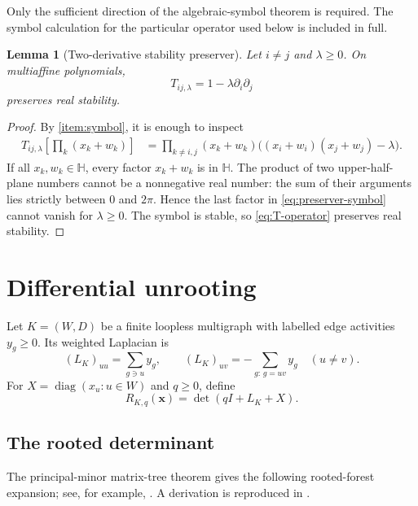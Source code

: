 \documentclass[11pt]{article}
\numberwithin{equation}{section}
\newtheorem{lemma}[theorem]{Lemma}
\newcommand{\Hh}{\mathbb H}
\newcommand{\xx}{\bm x}
\newcommand{\diag}{\operatorname{diag}}
\begin{document}
Only the sufficient direction of the algebraic-symbol theorem is required.  The symbol calculation for the particular operator used below is included in full.

\begin{lemma}[Two-derivative stability preserver]\label{lem:preserver}
Let $i\neq j$ and $\lambda\geq0$.  On multiaffine polynomials,
\begin{equation}\label{eq:T-operator}
 T_{ij,\lambda}=1-\lambda\partial_i\partial_j
\end{equation}
preserves real stability.
\end{lemma}

\begin{proof}
By \ref{item:symbol}, it is enough to inspect
\begin{align}
 T_{ij,\lambda}\!\left[\prod_k(x_k+w_k)\right]
 &=\prod_{k\neq i,j}(x_k+w_k)
 \bigl((x_i+w_i)(x_j+w_j)-\lambda\bigr).
 \label{eq:preserver-symbol}
\end{align}
If all $x_k,w_k\in\Hh$, every factor $x_k+w_k$ is in $\Hh$.  The product of two upper-half-plane numbers cannot be a nonnegative real number: the sum of their arguments lies strictly between $0$ and $2\pi$.  Hence the last factor in \eqref{eq:preserver-symbol} cannot vanish for $\lambda\geq0$.  The symbol is stable, so \eqref{eq:T-operator} preserves real stability.
\end{proof}

\section{Differential unrooting}\label{sec:unrooting}

Let $K=(W,D)$ be a finite loopless multigraph with labelled edge activities $y_g\geq0$.  Its weighted Laplacian is
\[
 (L_K)_{uu}=\sum_{g\ni u}y_g,
 \qquad
 (L_K)_{uv}=-\sum_{g:\,g=uv}y_g
 \quad(u\neq v).
\]
For $X=\diag(x_u:u\in W)$ and $q\geq0$, define
\begin{equation}\label{eq:R-def}
 R_{K,q}(\xx)=\det(qI+L_K+X).
\end{equation}

\subsection{The rooted determinant}

The principal-minor matrix-tree theorem gives the following rooted-forest expansion; see, for example, \cite{ChebotarevShamis1997}.  A derivation is reproduced in .
\end{document}
